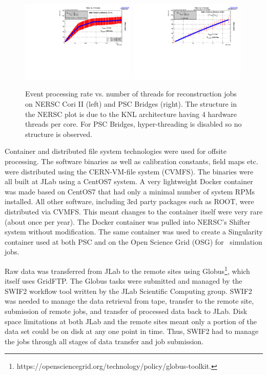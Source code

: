 \begin{figure}[h!]\centering
\includegraphics[width=0.49\textwidth]{figures/production_offsite_rate_vs_nthreads_NERSC.pdf}
\includegraphics[width=0.49\textwidth]{figures/production_offsite_rate_vs_nthreads_PSC.pdf}
\caption[]{\label{fig:production_offsite_rate_vs_nthreads_NERSC}Event processing rate vs. number of threads for reconstruction jobs on NERSC Cori II (left) and PSC Bridges (right). The structure in the NERSC plot is due to the KNL architecture having 4 hardware threads per core. For PSC Bridges, hyper-threading is disabled so no structure is observed.} 
\end{figure}

Container and distributed file system technologies were used for offsite processing. The software binaries as well as calibration constants, field maps etc. were distributed using the CERN-VM-file system (CVMFS). The binaries were all built at JLab using a CentOS7 system. A very lightweight Docker container was made based on CentOS7 that had only a minimal number of system RPMs installed. All other software, including 3rd party packages such as ROOT, were distributed via CVMFS. This meant changes to the container itself were very rare (about once per year). The Docker container was pulled into NERSC's Shifter system without modification. The same container was used to create a Singularity container used at both PSC and on the Open Science Grid (OSG) for \GX~simulation jobs.

Raw data was transferred from JLab to the remote sites using Globus\footnote{https://opensciencegrid.org/technology/policy/globus-toolkit.},  which itself uses GridFTP. The Globus tasks were submitted and managed by the SWIF2 workflow tool written by the JLab Scientific Computing group. SWIF2 was needed to manage the data retrieval from tape, transfer to the remote site, submission of remote jobs, and transfer of processed data back to JLab. Disk space limitations at both JLab and the remote sites meant only a portion of the data set could be on disk at any one point in time. Thus, SWIF2 had to manage the jobs through all stages of data transfer and job submission.

